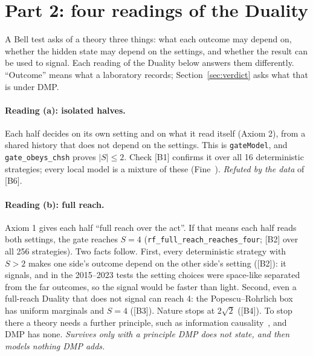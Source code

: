 \documentclass[11pt,a4paper]{article}
\theoremstyle{definition}
\theoremstyle{remark}
\newcommand{\lean}[1]{\texttt{#1}}
\newcommand{\chk}[1]{\textsf{[#1]}}
\begin{document}
\section{Part 2: four readings of the Duality}\label{sec:readings}

A Bell test asks of a theory three things: what each outcome may depend on, whether the hidden state may depend on the settings, and
whether the result can be used to signal. Each reading of the Duality below answers them differently. ``Outcome'' means what a
laboratory records; Section~\ref{sec:verdict} asks what that is under DMP.

\paragraph{Reading (a): isolated halves.} Each half decides on its own setting and on what it read itself (Axiom 2), from a shared
history that does not depend on the settings. This is \lean{gateModel}, and \lean{gate\_obeys\_chsh} proves $|S|\le2$. Check \chk{B1}
confirms it over all 16 deterministic strategies; every local model is a mixture of these (Fine~\cite{fine}). \emph{Refuted by the
data} of \chk{B6}.

\paragraph{Reading (b): full reach.} Axiom 1 gives each half ``full reach over the act''. If that means each half reads both settings, the
gate reaches $S=4$ (\lean{rf\_full\_reach\_reaches\_four}; \chk{B2} over all 256 strategies). Two facts follow. First, every deterministic
strategy with $S>2$ makes one side's outcome depend on the other side's setting (\chk{B2}): it signals, and in the 2015--2023 tests the
setting choices were space-like separated from the far outcomes, so the signal would be faster than light. Second, even a full-reach
Duality that does not signal can reach 4: the Popescu--Rohrlich box~\cite{pr} has uniform marginals and $S=4$ (\chk{B3}). Nature stops at
$2\sqrt2$ (\chk{B4}). To stop there a theory needs a further principle, such as information causality~\cite{ic}, and DMP has none.
\emph{Survives only with a principle DMP does not state, and then models nothing DMP adds.}
\end{document}
